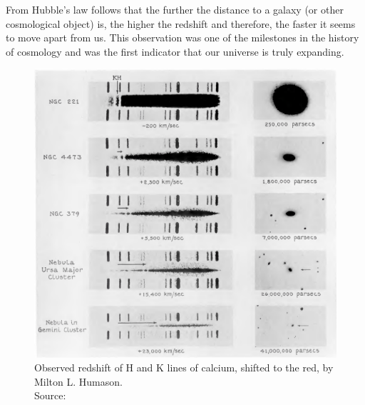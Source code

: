 \noindent From Hubble's law follows that the further the distance to a galaxy (or other cosmological object) is, the higher the redshift and therefore, the faster it seems to move apart from us. This observation was one of the milestones in the history of cosmology and was the first indicator that our universe is truly expanding.


\begin{figure}[H]
    \begin{minipage}{8cm}
        \centering 
        \includegraphics[scale=0.3]{figures/images/humason_redshifts-in-the-spectra-of-extra-galactic-nebulae.png}
        \caption{Observed redshift of H and K lines of calcium, shifted to the red, by Milton L. Humason.  \\ 
        Source: \cite[Figure ``Red-shifts in the Spectra of Extra-galactic Nebulae'']{Humason1936}}
    \end{minipage}
    \hspace{1cm}
    \begin{minipage}{8cm}
        \centering

\end{minipage}
\end{figure}
